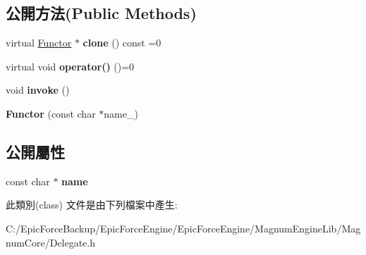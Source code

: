 \subsection*{公開方法(Public Methods)}
\begin{DoxyCompactItemize}
\item 
virtual \hyperlink{class_magnum_1_1_functor}{Functor} $\ast$ {\bfseries clone} () const  =0\hypertarget{class_magnum_1_1_functor_a9471e69dd9196fa171f6ab041f66ccb7}{}\label{class_magnum_1_1_functor_a9471e69dd9196fa171f6ab041f66ccb7}

\item 
virtual void {\bfseries operator()} ()=0\hypertarget{class_magnum_1_1_functor_af8ab6ce30f601c813c12973e1bde4dab}{}\label{class_magnum_1_1_functor_af8ab6ce30f601c813c12973e1bde4dab}

\item 
void {\bfseries invoke} ()\hypertarget{class_magnum_1_1_functor_a795d2f6c6b21b36b335878033448a2af}{}\label{class_magnum_1_1_functor_a795d2f6c6b21b36b335878033448a2af}

\item 
{\bfseries Functor} (const char $\ast$name\+\_)\hypertarget{class_magnum_1_1_functor_ac78bd7c840f9e506e4187cce3dad9145}{}\label{class_magnum_1_1_functor_ac78bd7c840f9e506e4187cce3dad9145}

\end{DoxyCompactItemize}
\subsection*{公開屬性}
\begin{DoxyCompactItemize}
\item 
const char $\ast$ {\bfseries name}\hypertarget{class_magnum_1_1_functor_a1ad6ba25f25d07bf1a7ac6e74f3a95df}{}\label{class_magnum_1_1_functor_a1ad6ba25f25d07bf1a7ac6e74f3a95df}

\end{DoxyCompactItemize}


此類別(class) 文件是由下列檔案中產生\+:\begin{DoxyCompactItemize}
\item 
C\+:/\+Epic\+Force\+Backup/\+Epic\+Force\+Engine/\+Epic\+Force\+Engine/\+Magnum\+Engine\+Lib/\+Magnum\+Core/Delegate.\+h\end{DoxyCompactItemize}
